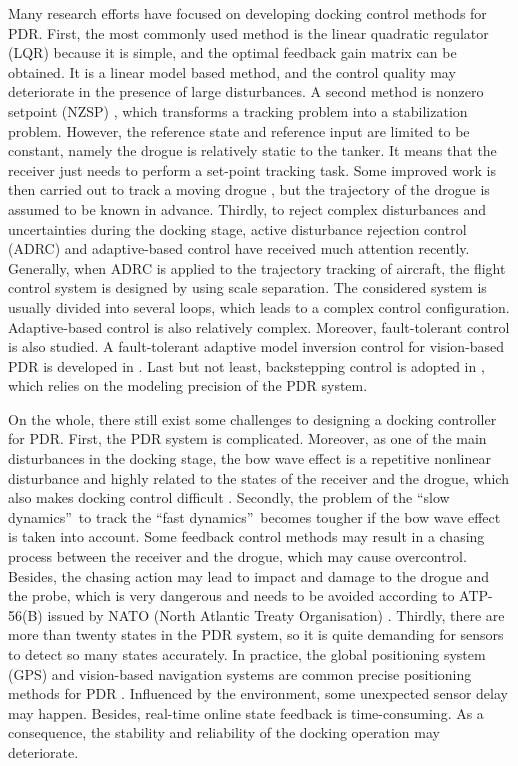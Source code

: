 Many research efforts have focused on developing docking control methods for
PDR. First, the most commonly used method is the linear quadratic regulator
(LQR) \cite{tandale2006trajectory,fravolini2004modeling} because it is simple,
and the optimal feedback gain matrix can be obtained. It is a linear model
based method, and the control quality may deteriorate in the presence of large
disturbances. A second method is nonzero setpoint (NZSP)
\cite{valasek2005vision}, which transforms a tracking problem into a
stabilization problem. However, the reference state and reference input are
limited to be constant, namely the drogue is relatively static to the tanker.
It means that the receiver just needs to perform a set-point tracking task.
Some improved work is then carried out to track a moving drogue
\cite{kimmett2002vision}, but the trajectory of the drogue is assumed to be
known in advance. Thirdly, to reject complex disturbances and uncertainties
during the docking stage, active disturbance rejection control (ADRC)
\cite{su2015autonomous} and adaptive-based control
\cite{wang2007verifiable,wang2008novel} have received much attention recently.
Generally, when ADRC is applied to the trajectory tracking of aircraft, the
flight control system is designed by using scale separation. The considered
system is usually divided into several loops, which leads to a complex control
configuration. Adaptive-based control is also relatively complex. Moreover,
fault-tolerant control is also studied. A fault-tolerant adaptive model
inversion control for vision-based PDR is developed in \cite{valasek2017fault}%
. Last but not least, backstepping control is adopted in
\cite{wang2014dynamic}, which relies on the modeling precision of the PDR system.

On the whole, there still exist some challenges to designing a docking
controller for PDR. First, the PDR system is complicated. Moreover, as one of
the main disturbances in the docking stage, the bow wave effect is a
repetitive nonlinear disturbance and highly related to the states of the
receiver and the drogue, which also makes docking control difficult
\cite{dai2016modeling,wei2016drogue}. Secondly, the problem of the
\textquotedblleft slow dynamics\textquotedblright \ to track the
\textquotedblleft fast dynamics\textquotedblright \ becomes tougher if the bow
wave effect is taken into account. Some feedback control methods may result in
a chasing process between the receiver and the drogue, which may cause
overcontrol. Besides, the chasing action may lead to impact and damage to the
drogue and the probe, which is very dangerous and needs to be avoided
according to ATP-56(B) issued by NATO (North Atlantic Treaty Organisation)
\cite{NATO-2004-3}. Thirdly, there are more than twenty states in the PDR
system, so it is quite demanding for sensors to detect so many states
accurately. In practice, the global positioning system (GPS) and vision-based
navigation systems are common precise positioning methods for PDR
\cite{thomas2014advances}. Influenced by the environment, some unexpected
sensor delay may happen. Besides, real-time online state feedback is
time-consuming. As a consequence, the stability and reliability of the docking
operation may deteriorate.

